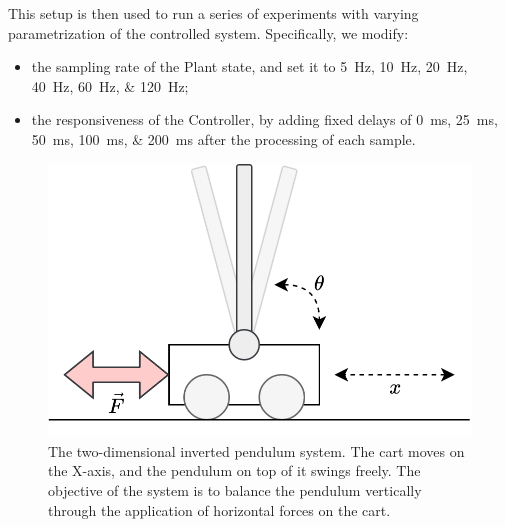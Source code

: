 This setup is then used to run a series of experiments with varying parametrization of the controlled system.
Specifically, we modify:
\begin{itemize}
    \item the sampling rate of the Plant state, and set it to \SIlist[list-units=single,list-final-separator={, or }]{5;10;20;40;60;120}{\hertz};
    \item the responsiveness of the Controller, by adding fixed delays of  \SIlist[list-units=single,list-final-separator={, or }]{0;25;50;100;200}{\milli\second} after the processing of each sample.
\end{itemize}

\begin{figure}
    \centering
    \includegraphics[width=.95\columnwidth]{images/inverted_pendulum.png}
    \caption{
        The two-dimensional inverted pendulum system.
        The cart moves on the X-axis, and the pendulum on top of it swings freely.
        The objective of the system is to balance the pendulum vertically through the application of horizontal forces on the cart.
    }\label{fig:invpend}
\end{figure}